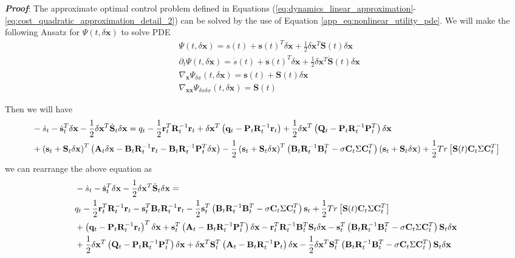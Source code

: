 \documentclass[letterpaper, 10 pt, conference]{ieeeconf}
\newcommand{\vq}{\mathbf q}
\newcommand{\vr}{\mathbf r}
\newcommand{\vs}{\mathbf s}
\newcommand{\vx}{\mathbf x}
\newcommand{\vA}{\mathbf A}
\newcommand{\vB}{\mathbf B}
\newcommand{\vC}{\mathbf C}
\newcommand{\vP}{\mathbf P}
\newcommand{\vQ}{\mathbf Q}
\newcommand{\vR}{\mathbf R}
\newcommand{\vS}{\mathbf S}
\begin{document}
\textbf{\textit{Proof}}: 
The approximate optimal control problem defined in Equations\! (\ref{eq:dynamics_linear_approximation}-\ref{eq:cost_quadratic_approximation_detail_2}) can be solved by the use of Equation \eqref{app_eq:nonlinear_utility_pde}. We will make the following Ansatz for $\Psi(t,\delta\vx)$ to solve PDE
\begin{align}
&\Psi(t,\delta\vx) = s(t) + \vs(t)^T\delta\vx + \frac{1}{2}\delta\vx^T\vS(t)\delta\vx \\ 
&\partial_t \Psi(t,\delta\vx) = \dot{s}(t) + \dot{\vs}(t)^T\delta\vx + \frac{1}{2}\delta\vx^T\dot{\vS}(t)\delta\vx \\
&\nabla_{\vx}\Psi_{\delta x}(t,\delta\vx) = \vs(t) + \vS(t)\delta\vx  \\
&\nabla_{\vx\vx}\Psi_{\delta x  \delta x}(t,\delta\vx) = \vS(t) 
\end{align} 

Then we will have 
\begin{align}
&-\dot{s}_t - \dot{\vs}_t^T\delta\vx - \frac{1}{2}\delta\vx^T\dot{\vS}_t\delta\vx = 
q_{t} -\frac{1}{2} \vr_t^T \vR_t^{-1} \vr_t + \delta\vx^T \left(\vq_{t} - \vP_t \vR_t^{-1} \vr_t \right) + \frac{1}{2} \delta\vx^T \left( \vQ_{t}-\vP_t \vR_t^{-1} \vP_t^T \right) \delta\vx \notag \\
& + \left( \vs_t + \vS_t\delta\vx \right)^T \left( \vA_t\delta\vx - \vB_t \vR_t^{-1} \vr_t - \vB_t \vR_t^{-1} \vP_t^T \delta\vx \right) - \frac{1}{2} \left( \vs_t + \vS_t\delta\vx \right)^T \left( \vB_t\vR_t^{-1}\vB_t^T -\sigma \vC_t\Sigma\vC_t^T \right) \left( \vs_t + \vS_t \delta\vx \right)
+ \frac{1}{2} Tr\left[ \vS(t) \vC_t\Sigma\vC_t^T \right] 
\end{align}
we can rearrange the above equation as
\begin{align}
&-\dot{s}_t - \dot{\vs}_t^T\delta\vx - \frac{1}{2}\delta\vx^T\dot{\vS}_t\delta\vx = \notag \\
&q_{t} - \frac{1}{2} \vr_t^T \vR_t^{-1} \vr_t - \vs_t^T \vB_t \vR_t^{-1} \vr_t - \frac{1}{2} \vs_t^T \left( \vB_t\vR_t^{-1}\vB_t^T -\sigma \vC_t\Sigma\vC_t^T \right) \vs_t + \frac{1}{2} Tr\left[ \vS(t) \vC_t\Sigma\vC_t^T \right]  \notag \\
&+ \left(\vq_{t} - \vP_t \vR_t^{-1} \vr_t \right)^T \delta\vx + \vs_t^T \left( \vA_t - \vB_t \vR_t^{-1} \vP_t^T \right) \delta\vx - \vr_t^T \vR_t^{-1} \vB_t^T \vS_t \delta\vx - \vs_t^T \left( \vB_t\vR_t^{-1}\vB_t^T -\sigma \vC_t\Sigma\vC_t^T \right) \vS_t \delta\vx \notag \\
&+ \frac{1}{2} \delta\vx^T \left( \vQ_{t}-\vP_t \vR_t^{-1} \vP_t^T \right) \delta\vx + \delta\vx^T \vS_t^T \left( \vA_t - \vB_t \vR_t^{-1} \vP_t \right) \delta\vx - \frac{1}{2} \delta\vx^T \vS_t^T \left( \vB_t\vR_t^{-1}\vB_t^T -\sigma \vC_t\Sigma\vC_t^T \right) \vS_t \delta\vx 
\end{align}
\end{document}
